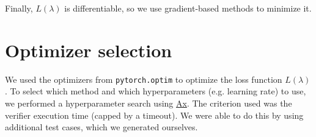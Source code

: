 \documentclass{article}
\begin{document}
Finally, $L(\lambda)$ is differentiable, so we use gradient-based methods to minimize it.

\section{Optimizer selection}

We used the optimizers from \texttt{pytorch.optim} to optimize the loss function $L(\lambda)$. 
To select which method and which hyperparameters (e.g. learning rate) to use, we performed a hyperparameter search using \href{https://github.com/facebook/Ax}{Ax}.
The criterion used was the verifier execution time (capped by a timeout).
We were able to do this by using additional test cases, which we generated ourselves.
\end{document}
